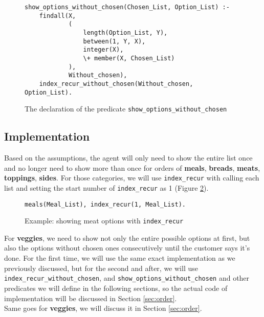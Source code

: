 \documentclass[12pt,a4paper]{article}
\newcommand{\varname}[1]{\texttt{#1}}
\newcommand{\predname}[1]{{\color{MidnightBlue}\varname{#1}}}
\begin{document}
\begin{figure}[H]
	\centering
\begin{lstlisting}[style=Prolog-pygsty]
% Define show_options_without_chosen
show_options_without_chosen(Chosen_List, Option_List) :- 
    findall(X,
            (	
            	length(Option_List, Y),
                between(1, Y, X),
                integer(X),
                \+ member(X, Chosen_List)
            ),
            Without_chosen),
    index_recur_without_chosen(Without_chosen, Option_List).
\end{lstlisting}
	\caption{The declaration of the predicate \predname{show\_options\_without\_chosen}} 
	\label{fig:showwithout}
\end{figure}

\subsection{Implementation}

Based on the assumptions, the agent will only need to show the entire list once and no longer need to show more than once for orders of \textbf{meals}, \textbf{breads}, \textbf{meats}, \textbf{toppings}, \textbf{sides}. For those categories, we will use \predname{index\_recur} with calling each list and setting the start number of \predname{index\_recur} as 1 (Figure \ref{fig:showonce}). \\ 


\begin{figure}[H]
	\centering
\begin{lstlisting}[style=Prolog-pygsty]
% Showing all meats options
meals(Meal_List), index_recur(1, Meal_List).
\end{lstlisting}
	\caption{Example: showing meat options with \predname{index\_recur}} 
	\label{fig:showonce}
\end{figure}

\newpage
For \textbf{veggies}, we need to show not only the entire possible options at first, but also the options without chosen ones consecutively until the customer says it's done. For the first time, we will use the same exact implementation as we previously discussed, but for the second and after, we will use \predname{index\_recur\_without\_chosen}, and \predname{show\_options\_without\_chosen} and other predicates we will define in the following sections, so the actual code of implementation will be discussed in Section \ref{sec:order}.\\ 

Same goes for \textbf{veggies}, we will discuss it in Section \ref{sec:order}.
\end{document}
